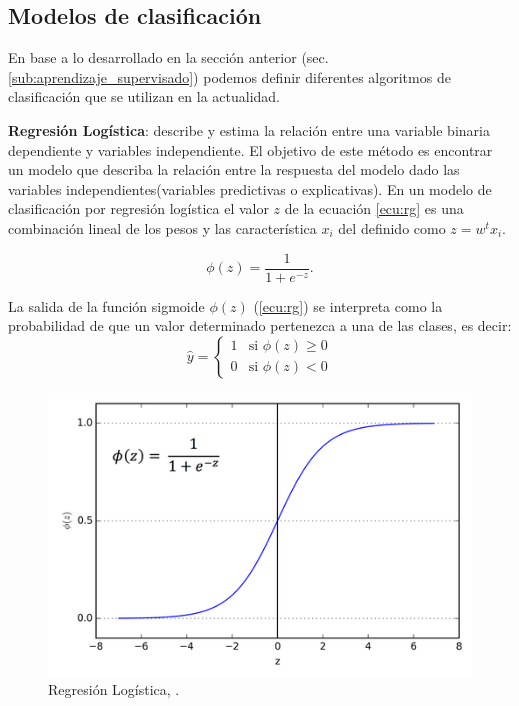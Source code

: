 \subsection{Modelos de clasificación}\label{sub:clasificadores}

En base a lo desarrollado en la sección anterior (sec.\ref{sub:aprendizaje_supervisado}) podemos definir diferentes algoritmos de clasificación que se utilizan en la actualidad.

\par \textbf{Regresión Logística}: describe y estima la relación entre una variable binaria dependiente y variables independiente. El objetivo de este método es encontrar un modelo que describa la relación entre la respuesta del modelo dado las variables independientes(variables predictivas o explicativas). En un modelo de clasificación por regresión logística el valor $z$ de la ecuación \ref {ecu:rg} es una combinación lineal de los pesos y las característica $x_i$ del definido como $z=w^t x_i$. 
   

\begin{equation}\label{ecu:rg}
\phi(z) = \frac{1}{1+e^{-z}}.
\end{equation}

La salida de la función sigmoide $\phi(z)$ (\ref {ecu:rg}) se interpreta como la probabilidad de que un valor determinado pertenezca a una de las clases, es decir:
\begin{equation}\label{ecu:f_sig_class}
\hat{y} = \left \{\begin{matrix} 1 & \mbox{si }\phi(z) \ge 0
\\ 0 & \mbox{si }\phi(z) < 0 \end{matrix}\right. 
\end{equation}


\begin{figure}[H]
 \centering
  \includegraphics[scale=0.5]{imagenes/MarcoTeorico/sigmoide.png}
  \caption{Regresión Logística, \citep{bishop}.}
  \label{Fig: log_reg}
\end{figure}


